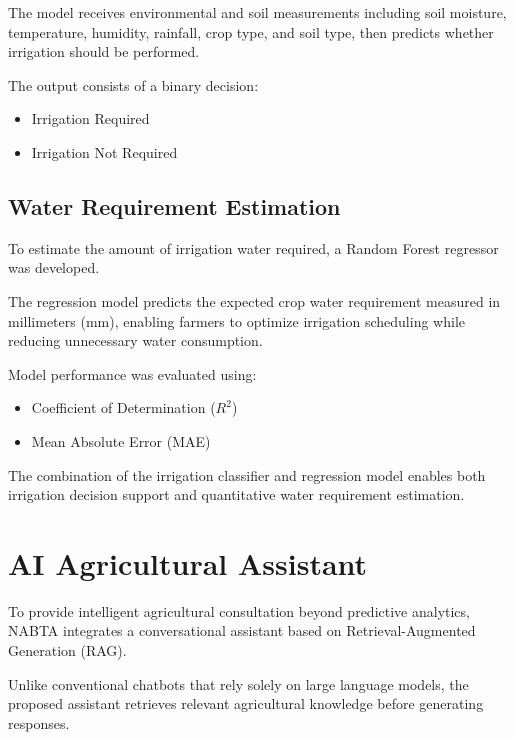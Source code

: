 The model receives environmental and soil measurements including soil moisture, temperature, humidity, rainfall, crop type, and soil type, then predicts whether irrigation should be performed.

The output consists of a binary decision:

\begin{itemize}[leftmargin=*]
\item Irrigation Required
\item Irrigation Not Required
\end{itemize}

\subsection{Water Requirement Estimation}

To estimate the amount of irrigation water required, a Random Forest regressor was developed.

The regression model predicts the expected crop water requirement measured in millimeters (mm), enabling farmers to optimize irrigation scheduling while reducing unnecessary water consumption.

Model performance was evaluated using:

\begin{itemize}[leftmargin=*]
\item Coefficient of Determination ($R^2$)
\item Mean Absolute Error (MAE)
\end{itemize}

The combination of the irrigation classifier and regression model enables both irrigation decision support and quantitative water requirement estimation.

\section{AI Agricultural Assistant}
\label{sec:rag_methodology}

To provide intelligent agricultural consultation beyond predictive analytics, NABTA integrates a conversational assistant based on Retrieval-Augmented Generation (RAG).

Unlike conventional chatbots that rely solely on large language models, the proposed assistant retrieves relevant agricultural knowledge before generating responses.

